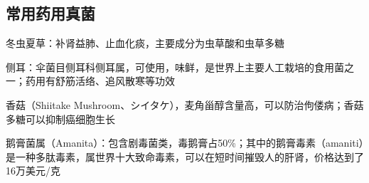 \subsection{常用药用真菌}%
\label{sub:常用药用真菌}
\begin{notation}
    冬虫夏草：补肾益肺、止血化痰，主要成分为虫草酸和虫草多糖
\end{notation}
\begin{notation}
    侧耳：伞菌目侧耳科侧耳属，可使用，味鲜，是世界上主要人工栽培的食用菌之一；药用有舒筋活络、追风散寒等功效
\end{notation}
\begin{notation}
    香菇（Shiitake Mushroom、シイタケ），麦角甾醇含量高，可以防治佝偻病；香菇多糖可以抑制癌细胞生长
\end{notation}
\begin{notation}
    鹅膏菌属（Amanita）：包含剧毒菌类，毒鹅膏占50\%；其中的鹅膏毒素（amaniti）是一种多肽毒素，属世界十大致命毒素，可以在短时间摧毁人的肝肾，价格达到了16万美元/克
\end{notation}
